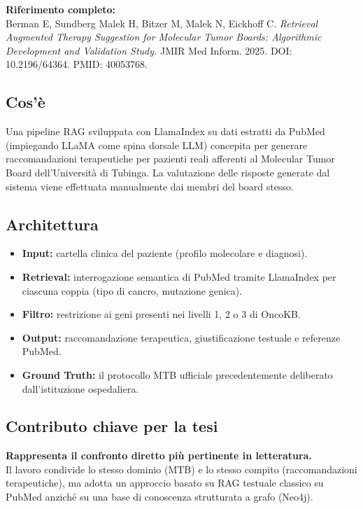 \documentclass[12pt, a4paper]{article}
\begin{document}
\textbf{Riferimento completo:}\\
Berman E, Sundberg Malek H, Bitzer M, Malek N, Eickhoff C. \textit{Retrieval Augmented Therapy Suggestion for Molecular Tumor Boards: Algorithmic Development and Validation Study.} JMIR Med Inform. 2025. DOI: 10.2196/64364. PMID: 40053768.

\subsection{Cos'è}
Una pipeline RAG sviluppata con LlamaIndex su dati estratti da PubMed (impiegando LLaMA come spina dorsale LLM) concepita per generare raccomandazioni terapeutiche per pazienti reali afferenti al Molecular Tumor Board dell'Università di Tubinga. La valutazione delle risposte generate dal sistema viene effettuata manualmente dai membri del board stesso.

\subsection{Architettura}
\begin{itemize}[leftmargin=1.8em, itemsep=2pt]
  \item \textbf{Input:} cartella clinica del paziente (profilo molecolare e diagnosi).
  \item \textbf{Retrieval:} interrogazione semantica di PubMed tramite LlamaIndex per ciascuna coppia (tipo di cancro, mutazione genica).
  \item \textbf{Filtro:} restrizione ai geni presenti nei livelli 1, 2 o 3 di OncoKB.
  \item \textbf{Output:} raccomandazione terapeutica, giustificazione testuale e referenze PubMed.
  \item \textbf{Ground Truth:} il protocollo MTB ufficiale precedentemente deliberato dall'istituzione ospedaliera.
\end{itemize}

\subsection{Contributo chiave per la tesi}
\textbf{Rappresenta il confronto diretto più pertinente in letteratura.}\\
Il lavoro condivide lo stesso dominio (MTB) e lo stesso compito (raccomandazioni terapeutiche), ma adotta un approccio basato su RAG testuale classico su PubMed anziché su una base di conoscenza strutturata a grafo (Neo4j).
\end{document}
